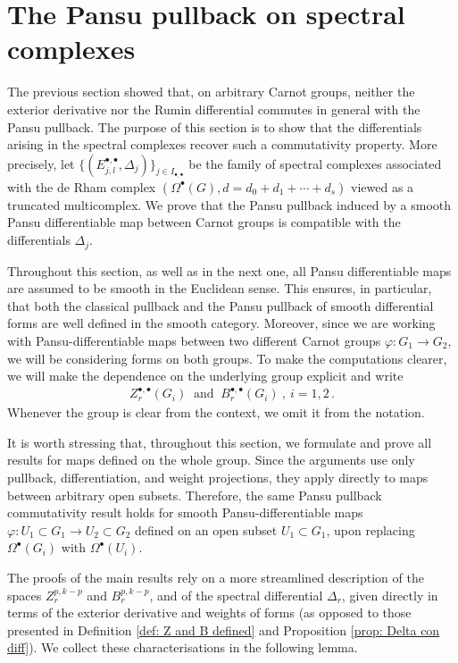 \documentclass[dvipsnames]{amsart}
\theoremstyle{definition}
\theoremstyle{definition}
\numberwithin{equation}{section}
\begin{document}
\section{The Pansu pullback on spectral complexes }\label{chapter commutativity}

The previous section showed that, on arbitrary Carnot groups, neither the
exterior derivative nor the Rumin differential commutes in general with the
Pansu pullback. The purpose of this section is to show that the differentials
arising in the spectral complexes recover such a commutativity property. More precisely, let $\{(E_{j,l}^{\bullet,\bullet},\Delta_j)\}_{j\in I_{\bullet,\bullet}}$ be the family of spectral complexes associated with the de Rham complex $(\Omega^\bullet(G),d=d_0+d_1+\cdots+d_s)$ viewed as a truncated multicomplex. We prove that the Pansu pullback induced
by a smooth Pansu differentiable map between Carnot groups is compatible with
the differentials $\Delta_j$.


Throughout this section, as well as in the next one, all Pansu differentiable
maps are assumed to be smooth in the Euclidean sense. This ensures, in
particular, that both the classical pullback and the Pansu pullback of smooth
differential forms are well defined in the smooth category. Moreover, since we are working with Pansu-differentiable maps between two different Carnot groups $\varphi\colon G_1\to G_2$, we will be considering forms on both groups. To make the computations clearer, we will make the dependence on the underlying group explicit and
write
\begin{align*}
Z_r^{\bullet,\bullet}(G_i)\ \text{ and }\ B_r^{\bullet,\bullet}(G_i)\ ,\  i=1,2\,.
    \end{align*}
Whenever the group is clear from the context, we omit it from the notation.


It is worth stressing that, throughout this section, we formulate and prove all results for maps defined on the whole group.
Since the arguments use only pullback, differentiation, and weight projections, they apply directly to maps between arbitrary open subsets. Therefore, the same Pansu pullback commutativity result holds for smooth Pansu-differentiable maps $\varphi\colon U_1\subset G_1\to U_2\subset G_2$ defined on an open subset $U_1\subset G_1$, upon replacing $\Omega^\bullet(G_i)$ with $\Omega^\bullet(U_i)$.

The proofs of the main results rely on a more streamlined description
of the spaces $Z_r^{p,k-p}$ and $B_r^{p,k-p}$, and of the spectral differential
$\Delta_r$, given directly in terms of the exterior derivative and weights of forms (as opposed to those presented in Definition \ref{def: Z and B defined} and Proposition \ref{prop: Delta con diff}). We collect these
characterisations in the following lemma.
\end{document}
